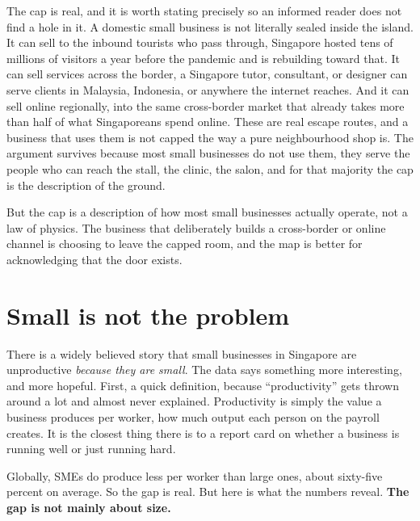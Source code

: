 \documentclass[10pt,twoside,openany]{memoir}
\newcommand{\needspacehead}{\needspace{4\baselineskip}}
\let\oldsection\section
\renewcommand{\section}{\needspacehead\oldsection}
\begin{document}
{{{{{{{{The cap is real, and it is worth stating precisely so an informed reader
does not find a hole in it. A domestic small business is not literally
sealed inside the island. It can sell to the inbound tourists who pass
through, Singapore hosted tens of millions of visitors a year before the
pandemic and is rebuilding toward that. It can sell services across the
border, a Singapore tutor, consultant, or designer can serve clients in
Malaysia, Indonesia, or anywhere the internet reaches. And it can sell
online regionally, into the same cross-border market that already takes
more than half of what Singaporeans spend online. These are real escape
routes, and a business that uses them is not capped the way a pure
neighbourhood shop is. The argument survives because most small
businesses do not use them, they serve the people who can reach the
stall, the clinic, the salon, and for that majority the cap is the
description of the ground.

But the cap is a description of how most small businesses actually
operate, not a law of physics. The business that deliberately builds a
cross-border or online channel is choosing to leave the capped room, and
the map is better for acknowledging that the door exists.

\section{Small is not the problem}\label{small-is-not-the-problem}

There is a widely believed story that small businesses in Singapore are
unproductive \emph{because they are small}. The data says something more
interesting, and more hopeful. First, a quick definition, because
``productivity'' gets thrown around a lot and almost never explained.
Productivity is simply the value a business produces per worker, how
much output each person on the payroll creates. It is the closest thing
there is to a report card on whether a business is running well or just
running hard.

Globally, SMEs do produce less per worker than large ones, about
sixty-five percent on average. So the gap is real. But here is what the
numbers reveal. \textbf{The gap is not mainly about size.}

}}}}}}}}
\end{document}
